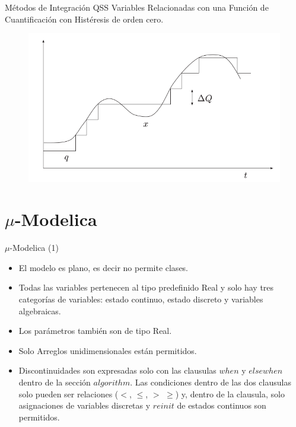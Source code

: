 \documentclass{beamer}
\begin{document}
\begin{frame}{Métodos de Integración QSS}
	  Variables Relacionadas con una Función de Cuantificación con Histéresis de orden cero.
	\begin{figure}[H]
	  \includegraphics[scale=0.35]{histeresis1}
	\end{figure}
\end{frame}

\section{$\mu$-Modelica}
\begin{frame}{$\mu$-Modelica (1)}
	\begin{itemize}
	 \item<1-> El modelo es plano, es decir no permite clases.
	 \item<2-> Todas las variables pertenecen al tipo predefinido Real y solo hay tres categorías de variables: estado continuo, estado discreto y variables 
	algebraicas.
	 \item<3-> Los parámetros también son de tipo Real. 
	 \item<4-> Solo Arreglos unidimensionales están permitidos. 
	 \item<5-> Discontinuidades son expresadas solo con las clausulas $when$ y $elsewhen$ dentro de la sección $algorithm$. Las condiciones dentro de las dos 
	clausulas solo pueden ser relaciones ($<$, $\leqslant$, $>$ $\geqslant$) y, dentro de la clausula, solo asignaciones de variables discretas y $reinit$ 
	de estados continuos son permitidos.
	\end{itemize}
\end{frame}
\end{document}
